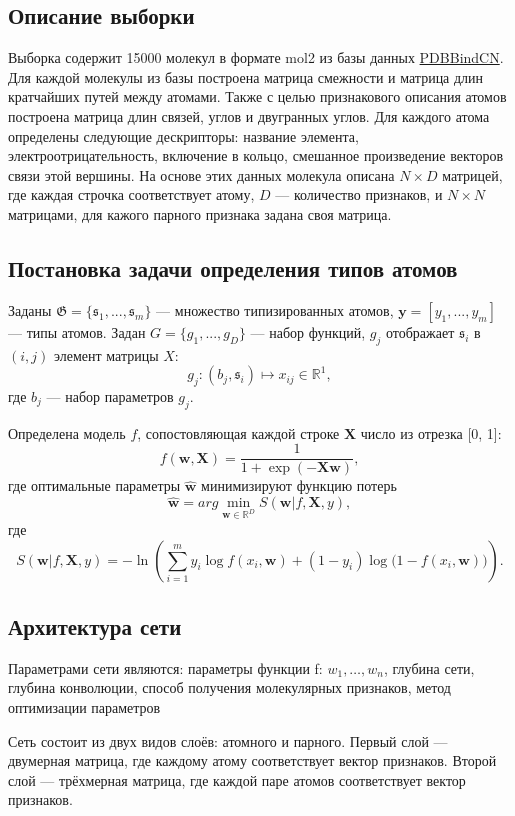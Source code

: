 \documentclass[12pt,twoside]{article}
\begin{document}
\subsection{Описание выборки}
Выборка содержит 15000 молекул в формате mol2 из базы данных \href{http://www.pdbbind.org.cn/}{PDBBindCN}. Для каждой молекулы из базы построена матрица смежности и матрица длин кратчайших путей между атомами. Также с целью признакового описания атомов построена матрица длин связей, углов и двугранных углов. Для каждого атома определены следующие дескрипторы: название элемента, электроотрицательность, включение в кольцо, смешанное произведение векторов связи этой вершины. На основе этих данных молекула описана $N\times D$ матрицей, где каждая строчка соответствует атому, $D$ --- количество признаков, и $N\times N$ матрицами, для кажого парного признака задана своя матрица.

\subsection{Постановка задачи определения типов атомов}
	Заданы  $\mathfrak{G} = \{\mathfrak{s}_1,...,\mathfrak{s}_m\}$ --- множество типизированных атомов, $\mathbf{y} = [y_1,...,y_m]$ --- типы атомов. Задан $G = \{g_1,...,g_{D}\}$ --- набор функций, $g_j$ отображает $\mathfrak{s}_i$ в $(i, j)$ элемент матрицы $X$: $$g_j: (b_j, \mathfrak{s}_i)\mapsto x_{ij} \in \mathbb{R}^1,$$ где $b_j$ --- набор параметров $g_j$.
	
	Определена модель $f$, сопостовляющая каждой строке $\mathbf{X}$ число из отрезка [0, 1]: $$f(\mathbf{w}, \mathbf{X}) = \frac{1}{1+\exp(-\mathbf{Xw})},$$ где оптимальные параметры $\hat{\mathbf{w}}$ минимизируют функцию потерь $$\hat{\mathbf{w}}=arg\min\limits_{\mathbf{w} \in \mathbb{R}^{D}} S(\mathbf{w}|f, \mathbf{X}, y),$$ где $$S(\mathbf{w}|f, \mathbf{X}, y)=-\ln\left(\sum_{i=1}^m {y_i \log f(x_i, \mathbf{w}) + (1-y_i)\log\bigl(1-f(x_i, \mathbf{w})\bigr)}\right).$$

\subsection{Архитектура сети}
	Параметрами сети являются: параметры функции f: $w_1,\dots,w_n$, глубина сети, глубина конволюции, способ получения молекулярных признаков, метод оптимизации параметров
	
	Сеть состоит из двух видов слоёв: атомного и парного. Первый слой --- двумерная матрица, где каждому атому соответствует вектор признаков. Второй слой --- трёхмерная матрица, где каждой паре атомов соответствует вектор признаков.
	
\end{document}
